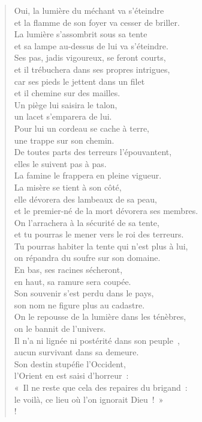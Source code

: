 \documentclass[french,twoside]{book} %
\def\mednobreak{\ifdim\lastskip<\medskipamount
  \removelastskip\nopagebreak\medskip\fi}
\newcommand{\labelblock}[1]{\medbreak{\noindent\color{rubric}\bfseries #1}\par\mednobreak}
\newcommand\chapterclose{} %
\begin{document}
\labelblock{Mort du méchant}


\begin{verse}
Oui, la lumière du méchant va s’éteindre \\
et la flamme de son foyer va cesser de briller.\\
La lumière s’assombrit sous sa tente \\
et sa lampe au-dessus de lui va s’éteindre.\\
Ses pas, jadis vigoureux, se feront courts, \\
et il trébuchera dans ses propres intrigues,\\
car ses pieds le jettent dans un filet \\
et il chemine sur des mailles.\\
Un piège lui saisira le talon, \\
un lacet s’emparera de lui.\\
Pour lui un cordeau se cache à terre, \\
une trappe sur son chemin.\\
De toutes parts des terreurs l’épouvantent, \\
elles le suivent pas à pas.\\
La famine le frappera en pleine vigueur. \\
La misère se tient à son côté,\\
elle dévorera des lambeaux de sa peau, \\
et le premier-né de la mort dévorera ses membres.\\
On l’arrachera à la sécurité de sa tente, \\
et tu pourras le mener vers le roi des terreurs.\\
Tu pourras habiter la tente qui n’est plus à lui, \\
on répandra du soufre sur son domaine.\\
En bas, ses racines sécheront, \\
en haut, sa ramure sera coupée.\\
Son souvenir s’est perdu dans le pays, \\
son nom ne figure plus au cadastre.\\
On le repousse de la lumière dans les ténèbres, \\
on le bannit de l’univers.\\
Il n’a ni lignée ni postérité dans son peuple , \\
aucun survivant dans sa demeure.\\
Son destin stupéfie l’Occident, \\
l’Orient en est saisi d’horreur :\\
« Il ne reste que cela des repaires du brigand : \\
le voilà, ce lieu où l’on ignorait Dieu ! »\\!
\end{verse}
\chapterclose
\end{document}
